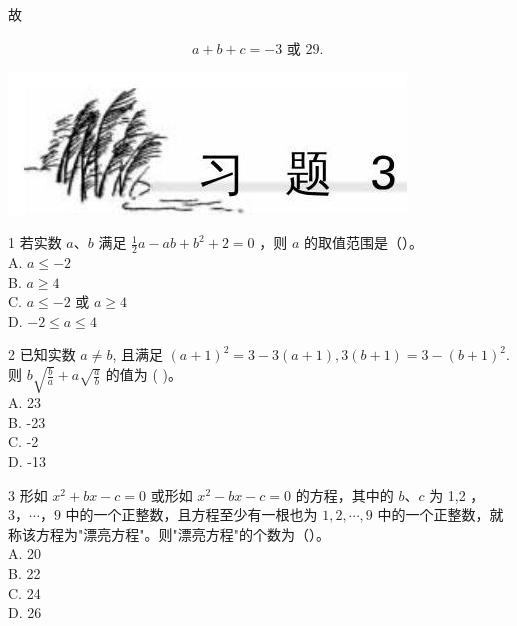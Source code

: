 \documentclass[10pt]{article}
\begin{document}
故

\begin{align*}
a+b+c=-3 \text { 或 } 29 \text {. }
\end{align*}

\begin{center}
\includegraphics[max width=\textwidth]{2024_10_30_1bf34f7aeb61f11d11d3g-054}
\end{center}

1 若实数 $a 、 b$ 满足 $\frac{1}{2} a-a b+b^{2}+2=0$ ，则 $a$ 的取值范围是（）。\\
A. $a \leqslant-2$\\
B. $a \geqslant 4$\\
C. $a \leqslant-2$ 或 $a \geqslant 4$\\
D. $-2 \leqslant a \leqslant 4$

2 已知实数 $a \neq b$, 且满足 $(a+1)^{2}=3-3(a+1), 3(b+1)=3-(b+1)^{2}$.则 $b \sqrt{\frac{b}{a}}+a \sqrt{\frac{a}{b}}$ 的值为 ( )。\\
A. 23\\
B. -23\\
C. -2\\
D. -13

3 形如 $x^{2}+b x-c=0$ 或形如 $x^{2}-b x-c=0$ 的方程，其中的 $b 、 c$ 为 1,2 ， $3 ， \cdots ， 9$ 中的一个正整数，且方程至少有一根也为 $1,2, \cdots, 9$ 中的一个正整数，就称该方程为"漂亮方程"。则"漂亮方程"的个数为（）。\\
A. 20\\
B. 22\\
C. 24\\
D. 26
\end{document}
